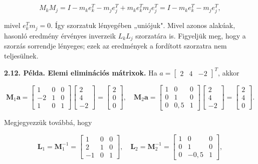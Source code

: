 \documentclass[
  magyar,
  11pt]{article}
\providecommand{\boldsymbol}[1]{\mathbf{#1}}
\begin{document}
\[M_k M_j = I - m_k e_k^T - m_j e_j^T + m_k e_k^T m_j e_j^T = I - m_k e_k^T - m_j e_j^T,\]

mivel \(e_k^T m_j = 0\). Így szorzatuk lényegében „uniójuk". Mivel
azonos alakúak, hasonló eredmény érvényes inverzeik \(L_k L_j\)
szorzatára is. Figyeljük meg, hogy a szorzás sorrendje lényeges; ezek az
eredmények a fordított szorzatra nem teljesülnek.

\textbf{2.12. Példa. Elemi eliminációs mátrixok.} Ha
\(a = \begin{bmatrix} 2 & 4 & -2 \end{bmatrix}^T\), akkor

\[\boldsymbol{M}_1 \boldsymbol{a} = \begin{bmatrix} 1 & 0 & 0 \\ -2 & 1 & 0 \\ 1 & 0 & 1 \end{bmatrix} \begin{bmatrix} 2 \\ 4 \\ -2 \end{bmatrix} = \begin{bmatrix} 2 \\ 0 \\ 0 \end{bmatrix}, \quad \boldsymbol{M}_2 \boldsymbol{a} = \begin{bmatrix} 1 & 0 & 0 \\ 0 & 1 & 0 \\ 0 & 0{,}5 & 1 \end{bmatrix} \begin{bmatrix} 2 \\ 4 \\ -2 \end{bmatrix} = \begin{bmatrix} 2 \\ 4 \\ 0 \end{bmatrix}.\]

Megjegyezzük továbbá, hogy

\[\boldsymbol{L}_1 = \boldsymbol{M}_1^{-1} = \begin{bmatrix} 1 & 0 & 0 \\ 2 & 1 & 0 \\ -1 & 0 & 1 \end{bmatrix}, \quad \boldsymbol{L}_2 = \boldsymbol{M}_2^{-1} = \begin{bmatrix} 1 & 0 & 0 \\ 0 & 1 & 0 \\ 0 & -0{,}5 & 1 \end{bmatrix},\]
\end{document}
